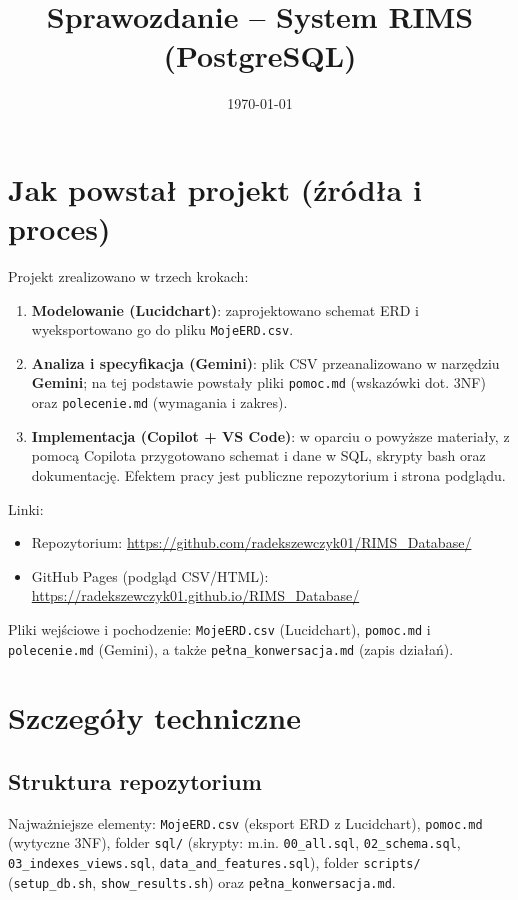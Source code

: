 \documentclass[12pt,a4paper]{article}
\title{Sprawozdanie – System RIMS (PostgreSQL)}
\author{}
\date{\today}
\begin{document}
\maketitle

\section{Jak powstał projekt (źródła i proces)}
Projekt zrealizowano w trzech krokach:
\begin{enumerate}
  \item \textbf{Modelowanie (Lucidchart)}: zaprojektowano schemat ERD i wyeksportowano go do pliku \texttt{MojeERD.csv}.
  \item \textbf{Analiza i specyfikacja (Gemini)}: plik CSV przeanalizowano w narzędziu \textbf{Gemini}; na tej podstawie powstały pliki \texttt{pomoc.md} (wskazówki dot. 3NF) oraz \texttt{polecenie.md} (wymagania i zakres).
  \item \textbf{Implementacja (Copilot + VS Code)}: w oparciu o powyższe materiały, z pomocą Copilota przygotowano schemat i dane w SQL, skrypty bash oraz dokumentację. Efektem pracy jest publiczne repozytorium i strona podglądu.
\end{enumerate}

Linki:
\begin{itemize}
  \item Repozytorium: \url{https://github.com/radekszewczyk01/RIMS_Database/}
  \item GitHub Pages (podgląd CSV/HTML): \url{https://radekszewczyk01.github.io/RIMS_Database/}
\end{itemize}

Pliki wejściowe i pochodzenie: \texttt{MojeERD.csv} (Lucidchart), \texttt{pomoc.md} i \texttt{polecenie.md} (Gemini), a także \texttt{pełna\_konwersacja.md} (zapis działań).

\section{Szczegóły techniczne}

\subsection{Struktura repozytorium}
Najważniejsze elementy: \texttt{MojeERD.csv} (eksport ERD z Lucidchart), \texttt{pomoc.md} (wytyczne 3NF), folder \texttt{sql/} (skrypty: m.in. \texttt{00\_all.sql}, \texttt{02\_schema.sql}, \texttt{03\_indexes\_views.sql}, \texttt{data\_and\_features.sql}), folder \texttt{scripts/} (\texttt{setup\_db.sh}, \texttt{show\_results.sh}) oraz \texttt{pełna\_konwersacja.md}.
\end{document}
